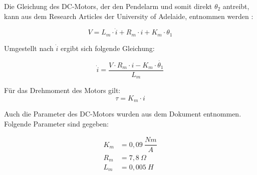 Die Gleichung des DC-Motors, der den Pendelarm und somit direkt $\theta_2$ antreibt, kann aus dem Research Articles der University of Adelaide, entnommen werden \citep{Cazzolato.2011}:

\begin{equation}
V = L_m \cdot \dot{i} + R_m \cdot i + K_m \cdot \theta_1
\end{equation}

Umgestellt nach $ \dot{i}$ ergibt sich folgende Gleichung:

\begin{equation}
 \dot{i} = \dfrac{V \cdot R_m \cdot i - K_m \cdot \dot{\theta_1}}{L_m}
\end{equation}

Für das Drehmoment des Motors gilt:
\begin{equation}
\tau = K_m \cdot i 
\end{equation}

Auch die Parameter des DC-Motors wurden aus dem Dokument entnommen. Folgende Parameter sind gegeben:

\begin{align}
K_m &= 0,09 ~\dfrac{Nm}{A} \\
R_m &= 7,8  ~\Omega \\
L_m &= 0,005  ~H 
\end{align}
